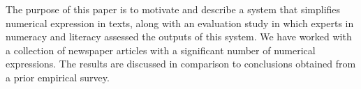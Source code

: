 The purpose of this paper is to motivate and describe a system that simplifies numerical expression in texts, along with an evaluation study in which experts
 in numeracy and literacy assessed the outputs of this system. We have worked
 with a collection of newspaper articles with a significant number of numerical
 expressions. The results are discussed in comparison to conclusions obtained
 from a prior empirical survey.

